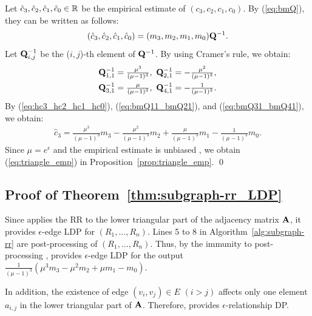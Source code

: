 {Let $\hat{c}_3, \hat{c}_2, \hat{c}_1, \hat{c}_0 \in \mathbb{R}$ be the empirical estimate of $(c_3, c_2, c_1, c_0)$. 
By (\ref{eq:bmQ}), they can be written as follows:
\begin{align}
(\hat{c}_3, \hat{c}_2, \hat{c}_1, \hat{c}_0) = (m_3, m_2, m_1, m_0) \mathbf{Q}^{-1}.
\label{eq:hc3_hc2_hc1_hc0}
\end{align}
Let $\mathbf{Q}_{i,j}^{-1}$ be the ($i,j$)-th element of $\mathbf{Q}^{-1}$. 
By using Cramer's rule, we obtain: 
\begin{align}
\mathbf{Q}_{1,1}^{-1} &= \textstyle{\frac{\mu^3}{(\mu-1)^3}},~ \mathbf{Q}_{2,1}^{-1} =  \textstyle{-\frac{\mu^2}{(\mu-1)^3}}, \label{eq:bmQ11_bmQ21}\\
\mathbf{Q}_{3,1}^{-1} &= \textstyle{\frac{\mu}{(\mu-1)^3}},~ \mathbf{Q}_{4,1}^{-1} = \textstyle{-\frac{1}{(\mu-1)^3}}.
\label{eq:bmQ31_bmQ41}
\end{align}
By (\ref{eq:hc3_hc2_hc1_hc0}), (\ref{eq:bmQ11_bmQ21}), and (\ref{eq:bmQ31_bmQ41}), we obtain:
\begin{align*}
\textstyle{\hat{c}_3 = \frac{\mu^3}{(\mu-1)^3} m_3 - \frac{\mu^2}{(\mu-1)^3} m_2 + \frac{\mu}{(\mu-1)^3} m_1 - \frac{1}{(\mu-1)^3} m_0.}
\end{align*}
Since $\mu = e^\epsilon$ and the empirical estimate is unbiased \cite{Kairouz_ICML16,Wang_USENIX17}, we obtain (\ref{eq:triangle_emp}) in Proposition~\ref{prop:triangle_emp}. \qed

\subsection{Proof of Theorem~\ref{thm:subgraph-rr_LDP}}
Since  applies the RR to the lower triangular part of the adjacency matrix $\mathbf{A}$, it provides $\epsilon$-edge LDP for $(R_1, \ldots, R_n)$. 
Lines 5 to 8 in Algorithm~\ref{alg:subgraph-rr} are post-processing of $(R_1, \ldots, R_n)$. 
Thus, by the immunity to post-processing \cite{DP},  provides $\epsilon$-edge LDP for the output $\frac{1}{(\mu-1)^3}(\mu^3 m_3 -\mu^2 m_2 + \mu m_1 - m_0)$. 

In addition, the existence of edge $(v_i,v_j) \in E$ $(i>j)$ affects only one element $a_{i,j}$ in the lower triangular part of $\mathbf{A}$. 
Therefore,  provides $\epsilon$-relationship DP.

}
